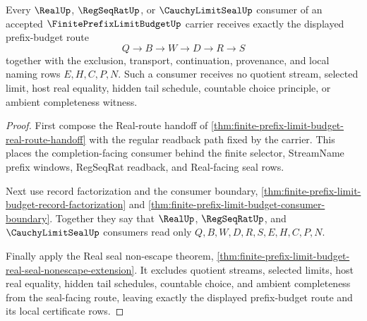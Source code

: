 \begin{theorem}
\label{thm:finite-prefix-limit-budget-seal-consumer-coverage}
Every $\RealUp$, $\RegSeqRatUp$, or $\CauchyLimitSealUp$ consumer of an accepted $\FinitePrefixLimitBudgetUp$ carrier receives exactly the displayed prefix-budget route
$$
Q \to B \to W \to D \to R \to S
$$
together with the exclusion, transport, continuation, provenance, and local naming rows $E,H,C,P,N$. Such a consumer receives no quotient stream, selected limit, host real equality, hidden tail schedule, countable choice principle, or ambient completeness witness.
\end{theorem}
\begin{proof}
First compose the Real-route handoff of \autoref{thm:finite-prefix-limit-budget-real-route-handoff} with the regular readback path fixed by the carrier. This places the completion-facing consumer behind the finite selector, StreamName prefix windows, RegSeqRat readback, and Real-facing seal rows.

Next use record factorization and the consumer boundary, \autoref{thm:finite-prefix-limit-budget-record-factorization} and \autoref{thm:finite-prefix-limit-budget-consumer-boundary}. Together they say that $\RealUp$, $\RegSeqRatUp$, and $\CauchyLimitSealUp$ consumers read only $Q,B,W,D,R,S,E,H,C,P,N$.

Finally apply the Real seal non-escape theorem, \autoref{thm:finite-prefix-limit-budget-real-seal-nonescape-extension}. It excludes quotient streams, selected limits, host real equality, hidden tail schedules, countable choice, and ambient completeness from the seal-facing route, leaving exactly the displayed prefix-budget route and its local certificate rows.
\end{proof}

